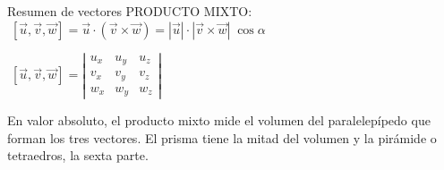 \begin{myalertblock}{Resumen de vectores}
\vspace{3mm} PRODUCTO MIXTO: $\; [\vec u, \vec v , \vec w]=\vec u\cdot (\vec v \times \vec w) = |\vec u|\cdot |\vec v \times \vec w|\; \cos \alpha$

\vspace{1mm} \hspace{10mm} $\; [\vec u, \vec v , \vec w]= \left| \begin{matrix}  u_x&u_y&u_z\\v_x&v_y&v_z\\w_x&w_y&w_z\end{matrix} \right|$

\vspace{1mm} \small{En valor absoluto, el producto mixto mide el volumen del paralelepípedo que forman los tres vectores. El prisma tiene la mitad del volumen y la pirámide o tetraedros, la sexta parte}\normalsize{.}
\end{myalertblock}


	
		
%
%


